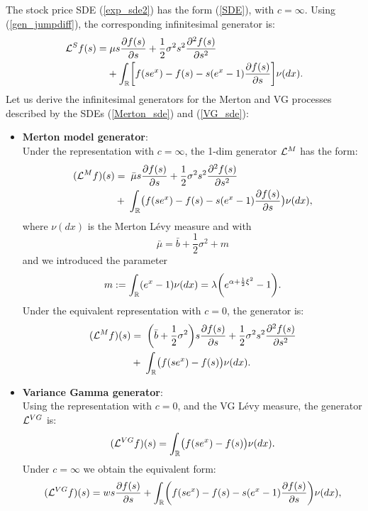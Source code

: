 The stock price SDE (\ref{exp_sde2}) has the form (\ref{SDE}), with $c=\infty$. Using (\ref{gen_jumpdiff}), the corresponding infinitesimal generator is:
\begin{align}\label{inf_gen_exp_levy}
 \mathcal{L}^S f(s) =& \; \mu s \frac{\partial f(s)}{\partial s}
+ \frac{1}{2} \sigma^2 s^2 \frac{\partial^2  f(s)}{\partial s^2}  \\ \nonumber
&+ \int_{\mathbb{R}} \biggl[ f(se^x) - f(s) - s(e^x-1)\frac{\partial f(s)}{\partial s} \biggr] \nu(dx).
\end{align}
Let us derive the infinitesimal generators for 
the Merton and VG processes described by the SDEs (\ref{Merton_sde}) and (\ref{VG_sde}): \\
\begin{itemize}
 \item \textbf{Merton model generator}:\\
\noindent
 Under the representation with $c=\infty$, the 1-dim generator $\mathcal{L}^{M}$ has the form:  
 \begin{align}\label{Merton_gen}
  (\mathcal{L}^{M} f)(s)  &= \;  \bar \mu s \frac{\partial f(s)}{\partial s} + \frac{1}{2} \sigma^2 s^2 \frac{\partial^2 f(s)}{\partial s^2} \\ \nonumber
  &+ \; \int_{\mathbb{R}} \bigl( f(s e^x) - f(s) - s(e^x-1)\frac{\partial f(s)}{\partial s} \bigr) \nu(dx), 
 \end{align}
where $\nu(dx)$ is the Merton Lévy measure and with $$ \bar \mu = \bar b + \frac{1}{2}\sigma^2 + m $$
and we introduced the parameter 
\begin{equation}\label{parameter_m} 
 m := \int_{\mathbb{R}} ( e^{x} - 1 ) \nu(dx) = \lambda \biggl( e^{\alpha + \frac{1}{2} \xi^2} -1 \biggr).
\end{equation}
Under the equivalent representation with $c=0$, the generator is:
 \begin{align}\label{Merton_gen}
  (\mathcal{L}^{M} f)(s)  &= \; \biggl( \bar b + \frac{1}{2}\sigma^2 \biggr)s \frac{\partial f(s)}{\partial s} 
                  + \frac{1}{2} \sigma^2 s^2 \frac{\partial^2 f(s)}{\partial s^2} \\ \nonumber
  &+ \; \int_{\mathbb{R}} \bigl( f(se^x) - f(s) \bigr) \nu(dx). 
 \end{align}
 \item \textbf{Variance Gamma generator}:\\
\noindent
 Using the representation with $c = 0$, and the VG Lévy measure, the generator $\mathcal{L}^{VG}$ is:
 \begin{equation}\label{VG_gen}
  (\mathcal{L}^{VG} f)(s) = \int_{\mathbb{R}} \bigl( f(se^x) - f(s) \bigr) \nu(dx).
 \end{equation}
 \newline
 Under $c = \infty$ we obtain the equivalent form: 
 \begin{equation}
  (\mathcal{L}^{VG} f)(s) = w s \frac{\partial f(s)}{\partial s} 
  + \int_{\mathbb{R}} \biggl( f(s e^x) - f(s) - s(e^x-1)\frac{\partial f(s)}{\partial s} \biggr) \nu(dx),
 \end{equation}
\end{itemize}
